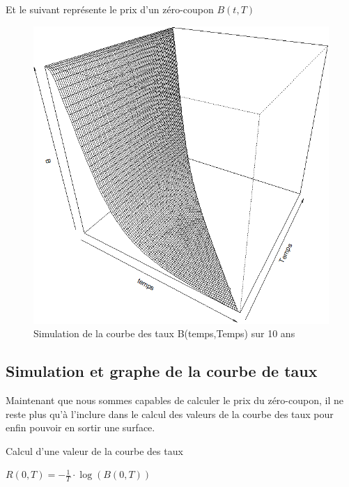 \documentclass[11pt]{article}
\begin{document}
Et le suivant représente le prix d'un zéro-coupon $B(t,T)$
\begin{center}
\begin{figure}[H]
        \centering \includegraphics[scale=0.60]{ZC_surface}
        \caption{Simulation de la courbe des taux B(temps,Temps) sur 10 ans}
\end{figure}
\end{center}



\subsection{Simulation et graphe de la courbe de taux}
Maintenant que nous sommes capables de calculer le prix du zéro-coupon,  il ne reste plus qu'à l'inclure dans le calcul des valeurs de la courbe des taux pour enfin pouvoir en sortir une surface.

\begin{algorithm}[H]
\caption{Calcul d'une valeur de la courbe des taux}
$R(0,T) = -\frac{1}{T} \cdot \log(B(0,T))$ %
\end{algorithm}
\end{document}
